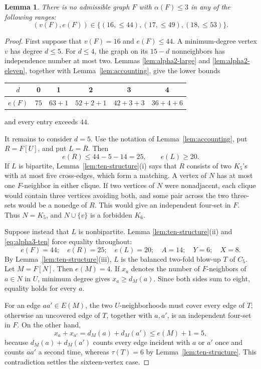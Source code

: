 \documentclass[11pt,reqno,a4paper]{amsart}
\newtheorem{lemma}[theorem]{Lemma}
\theoremstyle{definition}
\theoremstyle{remark}
\newcommand{\comp}[1]{\overline{#1}}
\begin{document}
\begin{lemma}\label{lem:alpha3-obstruction}
There is no admissible graph $F$ with $\alpha(F)\leq3$ in any of the
following ranges:
\[
  (v(F),e(F))\in
  \{(16,{\leq}44),(17,{\leq}49),(18,{\leq}53)\}.
\]
\end{lemma}

\begin{proof}
First suppose that $v(F)=16$ and $e(F)\leq44$.  A minimum-degree vertex
$v$ has degree $d\leq5$.  For $d\leq4$, the graph on its $15-d$
nonneighbors has independence number at most two.  Lemmas
\ref{lem:alpha2-large} and \ref{lem:alpha2-eleven}, together with
Lemma~\ref{lem:accounting}, give the lower bounds
\begin{center}
\begin{tabular}{c@{\qquad}ccccc}
\toprule
$d$ & 0 & 1 & 2 & 3 & 4\\
\midrule
$e(F)$ & $75$ & $63+1$ & $52+2+1$ & $42+3+3$ & $36+4+6$\\
\bottomrule
\end{tabular}
\end{center}
and every entry exceeds $44$.

It remains to consider $d=5$.  Use the notation of
Lemma~\ref{lem:accounting}, put $R=F[U]$, and put $L=\comp R$.  Then
\begin{equation}\label{eq:alpha3-ten}
  e(R)\leq44-5-14=25,
  \qquad e(L)\geq20.
\end{equation}
If $L$ is bipartite, Lemma~\ref{lem:ten-structure}(i) says that $R$ consists
of two $K_5$'s with at most five cross-edges, which form a matching.  A
vertex of $N$ has at most one $F$-neighbor in either clique.  If two
vertices of $N$ were nonadjacent, each clique would contain three vertices
avoiding both, and some pair across the two three-sets would be a nonedge of
$R$.  This would give an independent four-set in $F$.  Thus $N=K_5$, and
$N\cup\{v\}$ is a forbidden $K_6$.

Suppose instead that $L$ is nonbipartite.  Lemma
\ref{lem:ten-structure}(ii) and \eqref{eq:alpha3-ten} force equality
throughout:
\[
  e(F)=44;\quad e(R)=25;\quad e(L)=20;\quad
  A=14;\quad Y=6;\quad X=8.
\]
By Lemma~\ref{lem:ten-structure}(iii), $L$ is the balanced two-fold blow-up
$T$ of $C_5$.  Let $M=\comp{F[N]}$.  Then $e(M)=4$.  If $x_a$ denotes the
number of $F$-neighbors of $a\in N$ in $U$, minimum degree gives
$x_a\geq d_M(a)$.  Since both sides sum to eight, equality holds for every
$a$.

For an edge $aa'\in E(M)$, the two $U$-neighborhoods must cover every edge
of $T$; otherwise an uncovered edge of $T$, together with $a,a'$, is an
independent four-set in $F$.  On the other hand,
\[
  x_a+x_{a'}=d_M(a)+d_M(a')\leq e(M)+1=5,
\]
because $d_M(a)+d_M(a')$ counts every edge incident with $a$ or $a'$ once
and counts $aa'$ a second time,
whereas $\tau(T)=6$ by Lemma~\ref{lem:ten-structure}.  This contradiction
settles the sixteen-vertex case.


\end{proof}
\end{document}
